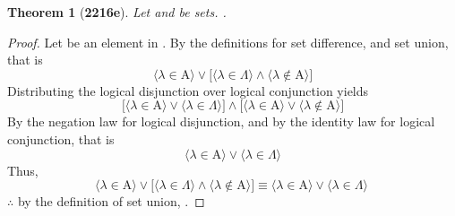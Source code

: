 \documentclass[preview]{standalone}
\newtheorem{theorem}{Theorem}
\begin{document}
\begin{theorem}[\textbf{2216e}]
    Let  and \bm{$\Lambda$} be sets. 
    .
\end{theorem}
\begin{proof}
    Let \bm{$\lambda$} be an element in 
    . 
    By the definitions for set difference, and set union, that is
    \begin{equation*}
        \Big \langle \lambda \in \mathrm{A} \Big \rangle 
            \lor 
        \bigg[
            \Big \langle \lambda \in \Lambda \Big \rangle 
                \land 
            \Big \langle \lambda \notin \mathrm{A} \Big \rangle 
        \bigg] 
    \end{equation*}
    Distributing the logical disjunction over logical conjunction yields
    \begin{equation*}
        \bigg[
            \Big \langle \lambda \in \mathrm{A} \Big \rangle 
                \lor 
            \Big \langle \lambda \in \Lambda \Big \rangle
        \bigg]
            \land
        \bigg[
            \Big \langle \lambda \in \mathrm{A} \Big \rangle
                \lor
            \Big \langle \lambda \notin \mathrm{A} \Big \rangle 
        \bigg]
    \end{equation*} 
    By the negation law for logical disjunction, 
    and by the identity law for logical conjunction, that is
    \begin{equation*}
        \Big \langle \lambda \in \mathrm{A} \Big \rangle 
        \lor 
        \Big \langle \lambda \in \Lambda \Big \rangle
    \end{equation*}
    Thus, 
    \begin{equation*}
        \Big \langle \lambda \in \mathrm{A} \Big \rangle 
            \lor 
        \bigg[
            \Big \langle \lambda \in \Lambda \Big \rangle 
                \land 
            \Big \langle \lambda \notin \mathrm{A} \Big \rangle 
        \bigg]
        \equiv
        \Big \langle \lambda \in \mathrm{A} \Big \rangle 
            \lor 
        \Big \langle \lambda \in \Lambda \Big \rangle\
    \end{equation*}
    $\therefore$ by the definition of set union,
    .
\end{proof}
\end{document}
